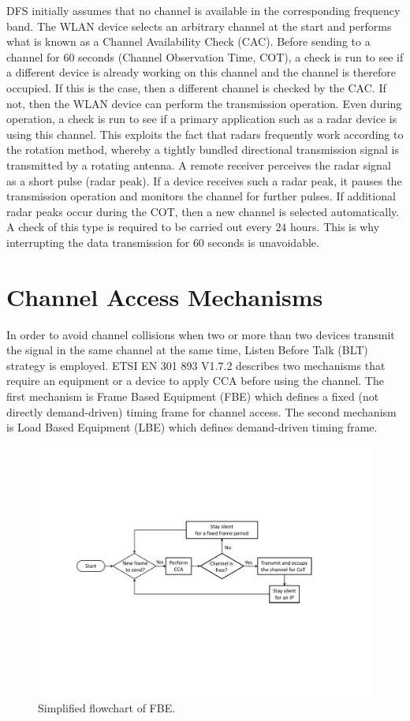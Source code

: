 \begin{itemize}
DFS initially assumes that no channel is available in the corresponding frequency band. The WLAN device selects an arbitrary channel at the start and performs what is known as a Channel Availability Check (CAC). Before sending to a channel for $60$ seconds (Channel Observation Time, COT), a check is run to see if a different device is already working on this channel and the channel is therefore occupied. If this is the case, then a different channel is checked by the CAC. If not, then the WLAN device can perform the transmission operation. Even during operation, a check is run to see if a primary application such as a radar device is using this channel. This exploits the fact that radars frequently work according to the rotation method, whereby a tightly bundled directional transmission signal is transmitted by a rotating antenna. A remote receiver perceives the radar signal as a short pulse (radar peak). If a device receives such a radar peak, it pauses the transmission operation and monitors the channel for further pulses. If additional radar peaks occur during the COT, then a new channel is selected automatically. A check of this type is required to be carried out every $24$ hours. This is why interrupting the data transmission for $60$ seconds is unavoidable. 


\section{Channel Access Mechanisms}
\label{subsec:ETSI-overview}

In order to avoid channel collisions when two or more than two devices transmit the signal in the same channel at the same time, Listen Before Talk (BLT) strategy is employed. ETSI EN 301 893 V1.7.2 \cite{LBT-ETSI-2014} describes two mechanisms that require an equipment or a device to apply CCA before using the channel. The first mechanism is Frame Based Equipment (FBE) which defines a fixed (not directly demand-driven) timing frame for channel access. The second mechanism is Load Based Equipment (LBE) which defines demand-driven timing frame.

\begin{figure}[!t]
	\centering
	\includegraphics[width=0.9\columnwidth]{figures2/FBE-flowchart}
	\caption{Simplified flowchart of FBE.}
	\label{figs:FBE-flowchart}
\end{figure}


\end{itemize}
